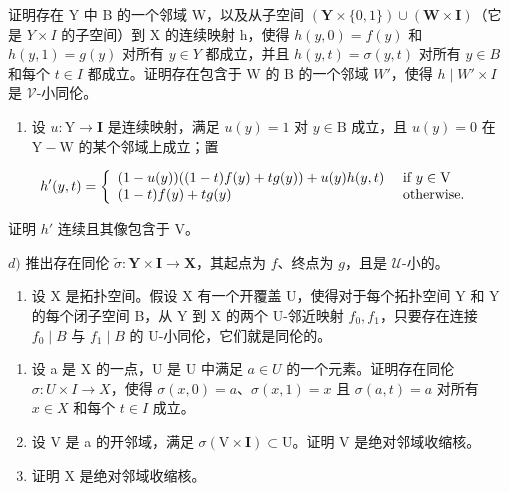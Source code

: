   证明存在 Y 中 B 的一个邻域 W，以及从子空间 \((\mathbf{Y} \times \{0,1\}) \cup (\mathbf{W} \times \mathbf{I})\)（它是 \(Y \times I\) 的子空间）到 X 的连续映射 h，使得 \(h(y,0) = f(y)\) 和 \(h(y,1) = g(y)\) 对所有 \(y \in Y\) 都成立，并且 \(h(y,t) = \sigma(y,t)\) 对所有 \(y \in B\) 和每个 \(t \in I\) 都成立。证明存在包含于 W 的 B 的一个邻域 \(W'\)，使得 \(h \mid W' \times I\) 是 \(\mathcal{V}\)-小同伦。

\begin{enumerate}
\def\labelenumi{\alph{enumi})}
\setcounter{enumi}{2}
\tightlist
\item
  设 \(u \colon \mathrm{Y} \to \mathbf{I}\) 是连续映射，满足 \(u(y) = 1\) 对 \(y \in \mathrm{B}\) 成立，且 \(u(y) = 0\) 在 \(\mathrm{Y} - \mathrm{W}\) 的某个邻域上成立；置
\end{enumerate}

\[
h ^ {\prime} (y, t) = \left\{ \begin{array}{l l} (1 - u (y)) ((1 - t) f (y) + t g (y)) + u (y) h (y, t) & \text { if } y \in \mathrm{V} \\ (1 - t) f (y) + t g (y) & \text { otherwise. } \end{array} \right.
\]

证明 \(h'\) 连续且其像包含于 V。

\(d)\) 推出存在同伦 \(\widetilde{\sigma}\colon\mathbf{Y}\times\mathbf{I}\to\mathbf{X}\)，其起点为 \(f\)、终点为 \(g\)，且是 \(\mathcal{U}\)-小的。

\begin{enumerate}
\def\labelenumi{\arabic{enumi})}
\setcounter{enumi}{9}
\tightlist
\item
  设 X 是拓扑空间。假设 X 有一个开覆盖 U，使得对于每个拓扑空间 Y 和 Y 的每个闭子空间 B，从 Y 到 X 的两个 U-邻近映射 \(f_{0}, f_{1}\)，只要存在连接 \(f_{0} \mid B\) 与 \(f_{1} \mid B\) 的 U-小同伦，它们就是同伦的。
\end{enumerate}

\begin{enumerate}
\def\labelenumi{\alph{enumi})}
\item
  设 a 是 X 的一点，U 是 U 中满足 \(a \in U\) 的一个元素。证明存在同伦 \(\sigma: U \times I \to X\)，使得 \(\sigma(x,0) = a\)、\(\sigma(x,1) = x\) 且 \(\sigma(a,t) = a\) 对所有 \(x \in X\) 和每个 \(t \in I\) 成立。
\item
  设 V 是 a 的开邻域，满足 \(\sigma(\mathrm{V} \times \mathbf{I}) \subset \mathrm{U}\)。证明 V 是绝对邻域收缩核。
\item
  证明 X 是绝对邻域收缩核。
\end{enumerate}


